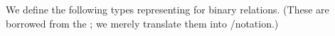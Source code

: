 We define the following types representing  for binary relations. (These are borrowed from the \agdastdlib; we merely translate them into \typetopology/\ualib notation.)
\ccpad
\begin{code}%
\>[0]\AgdaSpace{}%
\AgdaSymbol{:}\AgdaSpace{}%
\AgdaSymbol{(}\AgdaSpace{}%
\AgdaSpace{}%
\AgdaSpace{}%
\AgdaSpace{}%
\AgdaSymbol{)}\AgdaSpace{}%
\AgdaSpace{}%
\AgdaSymbol{(}\AgdaSpace{}%
\AgdaSpace{}%
\AgdaSymbol{)}\AgdaSpace{}%
\AgdaSpace{}%
\AgdaSymbol{(}\AgdaSpace{}%
\AgdaSpace{}%
\AgdaSpace{}%
\AgdaSpace{}%
\AgdaSymbol{)}\<%
\\
%
\>[0]\AgdaSpace{}%
\AgdaSpace{}%
\AgdaSpace{}%
\AgdaSymbol{=}\AgdaSpace{}%
\AgdaSpace{}%
\AgdaSpace{}%
\AgdaSpace{}%
\AgdaSpace{}%
\AgdaSpace{}%
\AgdaSymbol{(}\AgdaSpace{}%
\AgdaSymbol{)}\AgdaSpace{}%
\AgdaSymbol{(}\AgdaSpace{}%
\AgdaSymbol{)}\<%
\\
%
\\[\AgdaEmptyExtraSkip]%
%
\>[0]\AgdaSpace{}%
\AgdaSymbol{:}\AgdaSpace{}%

\end{code}
